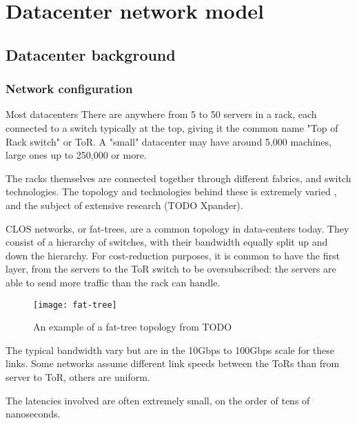 \chapter{Datacenter network model} \label{model}

\section{Datacenter background} \label{model-dc}

\subsection{Network configuration} \label{model-network}

Most datacenters \rotornet\cite{handley_re-architecting_2017}\opera
There are anywhere from 5 to 50 servers in a rack, each connected to a switch typically at the top, giving it the common name "Top of Rack switch" or ToR.
A "small" datacenter may have around 5,000 machines, large ones up to 250,000 or more. %

The racks themselves are connected together through different fabrics, and switch technologies.
The topology and technologies behind these is extremely varied \cite{kassing_beyond_2017}, and the subject of extensive research \opera\rotornet (TODO Xpander). %

CLOS networks, or fat-trees, are a common topology in data-centers today. %
They consist of a hierarchy of switches, with their bandwidth equally split up and down the hierarchy.
For cost-reduction purposes, it is common to have the first layer, from the servers to the ToR switch to be oversubscribed: the servers are able to send more traffic than the rack can handle.

\begin{figure}[h]
    \centering
    \texttt{[image: fat-tree]}
    \label{fig:fat-tree}
    \caption{An example of a fat-tree topology from TODO} %
\end{figure}

The typical bandwidth vary but are in the 10Gbps to 100Gbps scale for these links.
Some networks assume different link speeds between the ToRs than from server to ToR, others are uniform.

The latencies involved are often extremely small, on the order of tens of nanoseconds.


